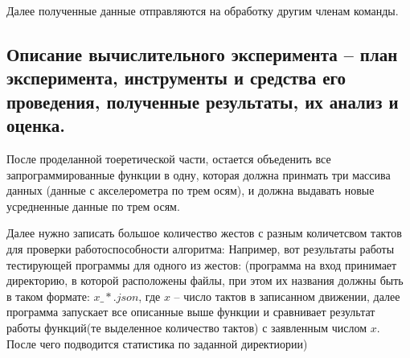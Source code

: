 Далее полученные данные отправляются на обработку другим членам команды.

\subsection{Описание вычислительного эксперимента – план эксперимента, инструменты и средства его проведения, полученные результаты, их анализ и оценка.}
После проделанной тоеретической части, остается объеденить все запрограммированные функции в одну, которая должна принмать три массива данных (данные с акселерометра по трем осям), и должна выдавать новые усредненные данные по трем осям.

Далее нужно записать большое количество жестов с разным количетсвом тактов для проверки работоспособности алгоритма:
Например, вот результаты работы тестирующей программы для одного из жестов:
(программа на вход принимает директорию, в которой расположены файлы, при этом их названия должны быть в таком формате: $x\_*.json$, где $x$ -- число тактов в записанном движении, далее программа запускает все описанные выше функции и сравнивает результат работы функций(те выделенное количество тактов) с заявленным числом $x$. После чего подводится статистика по заданной директиории)

\begin{figure}[H]
\end{figure}


